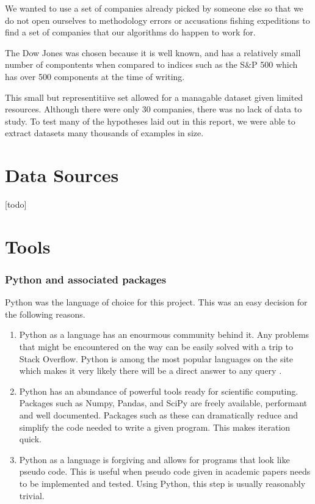 \documentclass{report}
\begin{document}
We wanted to use a set of companies already picked by someone else so that we do not open ourselves to methodology errors or accusations fishing expeditions to find a set of companies that our algorithms do happen to work for. 

The Dow Jones was chosen because it is well known, and has a relatively small number of compontents when compared to indices such as the S\&P 500 which has over 500 components at the time of writing. 

This small but representitiive set allowed for a managable dataset given limited resources. Although there were only 30 companies, there was no lack of data to study. To test many of the hypotheses laid out in this report, we were able to extract datasets many thousands of examples in size.

\section{Data Sources}

[todo]

\section{Tools}
\subsubsection{Python and associated packages}

Python was the language of choice for this project. This was an easy decision for the following reasons.

\begin{enumerate}
  \item Python as a language has an enourmous community behind it. Any problems that might be encountered on the way can be easily solved with a trip to Stack Overflow. Python is among the most popular languages on the site which makes it very likely there will be a direct answer to any query \cite{website:redmonk-languages}. 
  
  \item Python has an abundance of powerful tools ready for scientific computing. Packages such as Numpy, Pandas, and SciPy are freely available, performant and well documented. Packages such as these can dramatically reduce and simplify the code needed to write a given program. This makes iteration quick.

  \item Python as a language is forgiving and allows for programs that look like pseudo code. This is useful when pseudo code given in academic papers needs to be implemented and tested. Using Python, this step is usually reasonably trivial.

\end{enumerate}
\end{document}
